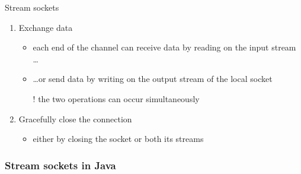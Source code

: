 \documentclass[presentation]{beamer}\mode<presentation>{\usetheme{AMSBolognaFC}}
\begin{document}
\begin{frame}[c, allowframebreaks]{Stream sockets}
\begin{enumerate}
        \smallskip

        \item Exchange data
        \begin{itemize}
            \item each end of the channel can \alert{receive} data by \alert{reading} on the \alert{input stream} \ldots
            \item \ldots or send data by \alert{writing} on the output stream of the local socket
            \item[!] the two operations can occur simultaneously
        \end{itemize}

        \smallskip

        \item Gracefully close the connection
        \begin{itemize}
            \item either by closing the socket or both its streams
        \end{itemize}
    \end{enumerate}

\end{frame}

\subsubsection{Stream sockets in Java}
\end{document}
